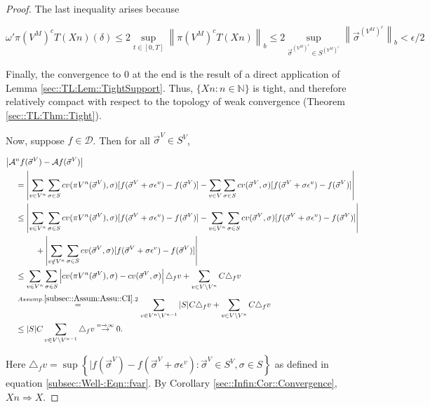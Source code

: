 \documentclass[12pt]{article}
\newcommand{\mb}{\mathbb}
\newcommand{\mc}{\mathcal}
\newcommand{\ra}{\rightarrow}
\newcommand{\os}{\overset}
\newcommand{\ep}{\epsilon}
\newcommand{\ind}{\hspace{24pt}}
\renewcommand{\v}{v}							%
\renewcommand{\S}{S}							%
\newcommand{\s}{\sigma}							%
\newcommand{\sv}{\vec{\s}}						%
\renewcommand{\b}{b}							%
\newcommand{\ev}{\ep}							%
\newcommand{\T}{T}								%
\renewcommand{\t}{t}							%
\newcommand{\proj}{\pi}							%
\newcommand{\X}{X}								%
\newcommand{\IG}{\mc{A}}						%
\newcommand{\IGr}{c}							%
\newcommand{\f}{f}								%
\newcommand{\vind}[1]{^{#1}}					%
\newcommand{\carp}[1]{^{#1}}					%
\newcommand{\vsi}[1]{^{#1}}						%
\newcommand{\cind}[1]{_{#1}}					%
\newcommand{\const}{C}							%
\newcommand{\sln}[1]{^{#1}}						%
\newcommand{\core}{\mc{D}}						%
\newcommand{\delt}{\triangle}					%
\newcommand{\cconst}{M}							%
\newcommand{\cmodu}{\omega'}					%
\newcommand{\deltf}[1]{_{#1}}					%
\begin{document}
\begin{proof}
The last inequality arises because

\[\cmodu{\proj{\left(V\sln{\cconst}\right)^c}{\T}(\X{}{}{n})}(\delta) \leq 2 \sup_{\t\in [0,\T]} \left\|\proj{\left(V\sln{\cconst}\right)^c}{\T}(\X{}{}{n})\right\|_{\b{}} \leq 2 \sup_{\sv\cind{}\vsi{\left(V\sln{\cconst}\right)^c} \in \S\carp{\left(V\sln{\cconst}\right)^c}} \left\|\sv\cind{}\vsi{\left(V\sln{\cconst}\right)^c}\right\|_{\b{}} < \ep/2\]

Finally, the convergence to 0 at the end is the result of a direct application of Lemma \ref{sec::TL:Lem::TightSupport}. Thus, \(\{\X{}{}{n}:n\in \mb{N}\}\) is tight, and therefore relatively compact with respect to the topology of weak convergence (Theorem \ref{sec::TL:Thm::Tight}).

Now, suppose \(f\in \core\). Then for all \(\sv\cind{}\vsi{V} \in \S\carp{V}\),

\begin{align*}
\big|\IG&\sln{n}f(\sv\cind{}\vsi{V}) - \IG f(\sv\cind{}\vsi{V})\big|\\
&= \left|\sum_{\v \in V\sln{n}} \sum_{\s \in \S} \IGr{\v}(\proj{V\sln{n}}{}(\sv\cind{}\vsi{V}),\s)[f(\sv\cind{}\vsi{V}+\s\ev\vind{\v}) - f(\sv\cind{}\vsi{V})] - \sum_{\v \in V}\sum_{\s \in \S} \IGr{\v}(\sv\cind{}\vsi{V},\s)[f(\sv\cind{}\vsi{V}+\s\ev\vind{\v}) - f(\sv\cind{}\vsi{V})]\right|\\
&\leq  \left|\sum_{\v \in V\sln{n}} \sum_{\s \in \S} \IGr{\v}(\proj{V\sln{n}}{}(\sv\cind{}\vsi{V}),\s)[f(\sv\cind{}\vsi{V}+\s\ev\vind{\v}) - f(\sv\cind{}\vsi{V})] - \sum_{\v \in V\sln{n}}\sum_{\s \in \S} \IGr{\v}(\sv\cind{}\vsi{V},\s)[f(\sv\cind{}\vsi{V}+\s\ev\vind{\v}) - f(\sv\cind{}\vsi{V})]\right|\\
&\ind  +\left|\sum_{\v \notin V\sln{n}} \sum_{\s\in \S} \IGr{\v}(\sv\cind{}\vsi{V},\s)[f(\sv\cind{}\vsi{V}+\s\ev\vind{\v}) - f(\sv\cind{}\vsi{V})]\right|\\
&\leq \sum_{\v \in V\sln{n}}\sum_{\s \in \S} \left|\IGr{\v}(\proj{V\sln{n}}{}(\sv\cind{}\vsi{V}),\s) - \IGr{\v}(\sv\cind{}\vsi{V},\s)\right|\delt\deltf{\f}{\v} + \sum_{\v \in V\setminus V\sln{n}} \const{}\delt\deltf{\f}{\v}\\
&\os{Assump. \ref{subsec::Assum:Assu::CI}.2}{=} \sum_{\v \in V\sln{n}\setminus V\sln{n-1}} |\S|\const{} \delt\deltf{\f}{\v} + \sum_{\v \in V\setminus V\sln{n}} \const{}\delt\deltf{\f}{\v}\\
&\leq |\S|C\sum_{\v \in V\setminus V\sln{n-1}} \delt\deltf{\f}{\v} \os{n\ra\infty}{\ra} 0.
\end{align*}

Here \(\delt\deltf{\f}{\v} = \sup\left\{|f(\sv\cind{}\vsi{V}) - f(\sv\cind{}\vsi{V} + \s\ev\vind{\v}): \sv\cind{}\vsi{V}\in \S\carp{V},\s \in \S\right\}\) as defined in equation \eqref{subsec::Well-:Eqn::fvar}. By Corollary \ref{sec::Infin:Cor::Convergence}, \(\X{}{}{n}\Rightarrow \X{}{}\).
\end{proof}
\end{document}
